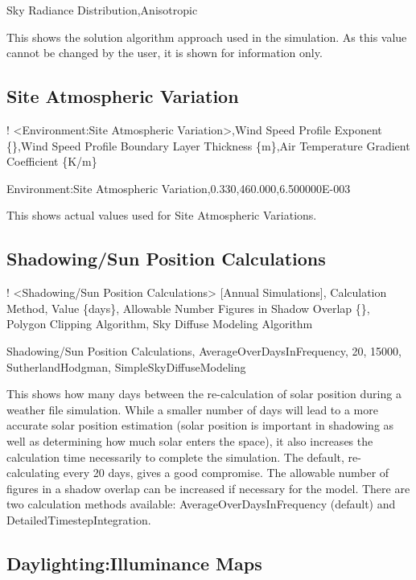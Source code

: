 Sky Radiance Distribution,Anisotropic

This shows the solution algorithm approach used in the simulation. As this value cannot be changed by the user, it is shown for information only.

\subsection{Site Atmospheric Variation}\label{site-atmospheric-variation}

! \textless{}Environment:Site Atmospheric Variation\textgreater{},Wind Speed Profile Exponent \{\},Wind Speed Profile Boundary Layer Thickness \{m\},Air Temperature Gradient Coefficient \{K/m\}

Environment:Site Atmospheric Variation,0.330,460.000,6.500000E-003

This shows actual values used for Site Atmospheric Variations.

\subsection{Shadowing/Sun Position Calculations}\label{shadowingsun-position-calculations}

! \textless{}Shadowing/Sun Position Calculations\textgreater{} {[}Annual Simulations{]}, Calculation Method, Value \{days\}, Allowable Number Figures in Shadow Overlap \{\}, Polygon Clipping Algorithm, Sky Diffuse Modeling Algorithm

Shadowing/Sun Position Calculations, AverageOverDaysInFrequency, 20, 15000, SutherlandHodgman, SimpleSkyDiffuseModeling

This shows how many days between the re-calculation of solar position during a weather file simulation. While a smaller number of days will lead to a more accurate solar position estimation (solar position is important in shadowing as well as determining how much solar enters the space), it also increases the calculation time necessarily to complete the simulation. The default, re-calculating every 20 days, gives a good compromise. The allowable number of figures in a shadow overlap can be increased if necessary for the model. There are two calculation methods available: AverageOverDaysInFrequency (default) and DetailedTimestepIntegration.

\subsection{Daylighting:Illuminance Maps}\label{daylighting-illuminace-maps}

